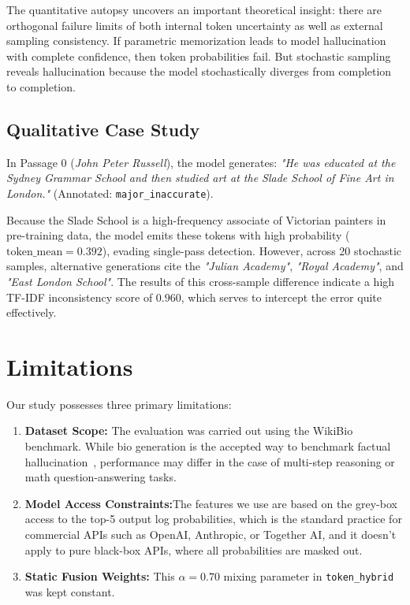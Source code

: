 \documentclass[conference]{IEEEtran}
\begin{document}
The quantitative autopsy uncovers an important theoretical insight: there are orthogonal failure limits of both internal token uncertainty as well as external sampling consistency. If parametric memorization leads to model hallucination with complete confidence, then token probabilities fail. But stochastic sampling reveals hallucination because the model stochastically diverges from completion to completion.

\subsection{Qualitative Case Study}
In Passage 0 (\textit{John Peter Russell}), the model generates: \textit{"He was educated at the Sydney Grammar School and then studied art at the Slade School of Fine Art in London."} (Annotated: \texttt{major\_inaccurate}). 

Because the Slade School is a high-frequency associate of Victorian painters in pre-training data, the model emits these tokens with high probability ($\text{token\_mean} = 0.392$), evading single-pass detection. However, across 20 stochastic samples, alternative generations cite the \textit{"Julian Academy"}, \textit{"Royal Academy"}, and \textit{"East London School"}. The results of this cross-sample difference indicate a high TF-IDF inconsistency score of $0.960$, which serves to intercept the error quite effectively.

\section{Limitations}
Our study possesses three primary limitations:
\begin{enumerate}
    \item \textbf{Dataset Scope:} The evaluation was carried out using the WikiBio benchmark. While bio generation is the accepted way to benchmark factual hallucination~\cite{manakul2023selfcheckgpt, min2023factscore},  performance may differ in the case of multi-step reasoning or math question-answering tasks.
    
    \item \textbf{Model Access Constraints:}The features we use are based on the grey-box access to the top-5 output log probabilities, which is the standard practice for commercial APIs such as OpenAI, Anthropic, or Together AI, and it doesn’t apply to pure black-box APIs, where all probabilities are masked out.
    \item \textbf{Static Fusion Weights:} This $\alpha=0.70$ mixing parameter in \texttt{token\_hybrid} was kept constant.
\end{enumerate}
\end{document}
